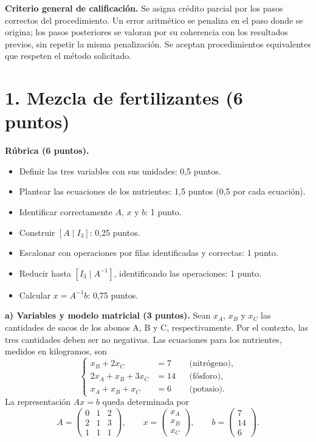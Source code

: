 \documentclass[10pt,a4]{examenEPN0}
\begin{document}
\encabezado

\noindent\textbf{Criterio general de calificación.} Se asigna crédito parcial
por los pasos correctos del procedimiento. Un error aritmético se penaliza
en el paso donde se origina; los pasos posteriores se valoran por su
coherencia con los resultados previos, sin repetir la misma penalización.
Se aceptan procedimientos equivalentes que respeten el método solicitado.

\section*{1. Mezcla de fertilizantes (6 puntos)}
\noindent\textbf{Rúbrica (6 puntos).}
\begin{itemize}[itemsep=2pt]
    \item Definir las tres variables con sus unidades: 0,5 puntos.
    \item Plantear las ecuaciones de los nutrientes: 1,5 puntos
          (0,5 por cada ecuación).
    \item Identificar correctamente $A$, $x$ y $b$: 1 punto.
    \item Construir $[A\mid I_3]$: 0,25 puntos.
    \item Escalonar con operaciones por filas identificadas y correctas: 1 punto.
    \item Reducir hasta $[I_3\mid A^{-1}]$, identificando las operaciones:
          1 punto.
    \item Calcular $x=A^{-1}b$: 0,75 puntos.
\end{itemize}

\noindent\textbf{a) Variables y modelo matricial (3 puntos).}
Sean $x_A$, $x_B$ y $x_C$ las cantidades de sacos de los abonos A, B y C,
respectivamente. Por el contexto, las tres cantidades deben ser no negativas.
Las ecuaciones para los nutrientes, medidos en kilogramos, son
\[
    \left\{\begin{aligned}
        x_B+2x_C&=7 &&\text{(nitrógeno)},\\
        2x_A+x_B+3x_C&=14 &&\text{(fósforo)},\\
        x_A+x_B+x_C&=6 &&\text{(potasio)}.
    \end{aligned}\right.
\]
La representación $Ax=b$ queda determinada por
\[
    A=\begin{pmatrix}0&1&2\\2&1&3\\1&1&1\end{pmatrix},\qquad
    x=\begin{pmatrix}x_A\\x_B\\x_C\end{pmatrix},\qquad
    b=\begin{pmatrix}7\\14\\6\end{pmatrix}.
\]
\end{document}
